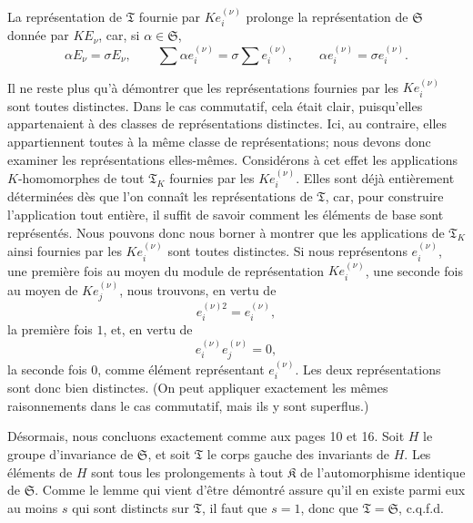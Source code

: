 La représentation de \(\mathfrak T\) fournie par \(K e_i^{(\nu)}\) prolonge la représentation de \(\mathfrak S\) donnée par \(K E_\nu\), car, si \(\alpha\in\mathfrak S\),
\[
\alpha E_\nu=\sigma E_\nu,
\qquad
\sum \alpha e_i^{(\nu)}=\sigma\sum e_i^{(\nu)},
\qquad
\alpha e_i^{(\nu)}=\sigma e_i^{(\nu)}.
\]

Il ne reste plus qu'à démontrer que les représentations fournies par les \(K e_i^{(\nu)}\) sont toutes distinctes. Dans le cas commutatif, cela était clair, puisqu'elles appartenaient à des classes de représentations distinctes. Ici, au contraire, elles appartiennent toutes à la même classe de représentations; nous devons donc examiner les représentations elles-mêmes. Considérons à cet effet les applications \(K\)-homomorphes de tout \(\mathfrak T_K\) fournies par les \(K e_i^{(\nu)}\). Elles sont déjà entièrement déterminées dès que l'on connaît les représentations de \(\mathfrak T\), car, pour construire l'application tout entière, il suffit de savoir comment les éléments de base sont représentés. Nous pouvons donc nous borner à montrer que les applications de \(\mathfrak T_K\) ainsi fournies par les \(K e_i^{(\nu)}\) sont toutes distinctes. Si nous représentons \(e_i^{(\nu)}\), une première fois au moyen du module de représentation \(K e_i^{(\nu)}\), une seconde fois au moyen de \(K e_j^{(\nu)}\), nous trouvons, en vertu de
\[
e_i^{(\nu)2}=e_i^{(\nu)},
\]
la première fois \(1\), et, en vertu de
\[
e_i^{(\nu)}e_j^{(\nu)}=0,
\]
la seconde fois \(0\), comme élément représentant \(e_i^{(\nu)}\). Les deux représentations sont donc bien distinctes. (On peut appliquer exactement les mêmes raisonnements dans le cas commutatif, mais ils y sont superflus.)

Désormais, nous concluons exactement comme aux pages 10 et 16. Soit \(H\) le groupe d'invariance de \(\mathfrak S\), et soit \(\mathfrak T\) le corps gauche des invariants de \(H\). Les éléments de \(H\) sont tous les prolongements à tout \(\mathfrak K\) de l'automorphisme identique de \(\mathfrak S\). Comme le lemme qui vient d'être démontré assure qu'il en existe parmi eux au moins \(s\) qui sont distincts sur \(\mathfrak T\), il faut que \(s=1\), donc que \(\mathfrak T=\mathfrak S\), c.q.f.d.
